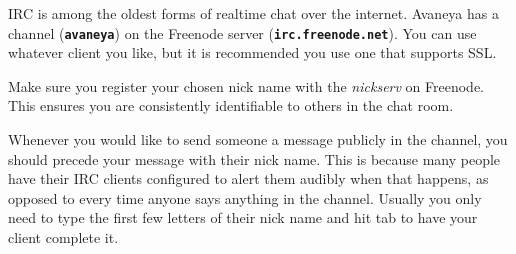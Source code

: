 
IRC is among the oldest forms of realtime chat over the internet. Avaneya has a channel ({\bf \tt \type{#}avaneya}) on the Freenode server ({\bf \tt irc.freenode.net}). You can use whatever client you like, but it is recommended you use one that supports SSL.

Make sure you register your chosen nick name with the {\it nickserv} on Freenode. This ensures you are consistently identifiable to others in the chat room.

Whenever you would like to send someone a message publicly in the channel, you should precede your message with their nick name. This is because many people have their IRC clients configured to alert them audibly when that happens, as opposed to every time anyone says anything in the channel. Usually you only need to type the first few letters of their nick name and hit tab to have your client complete it.


